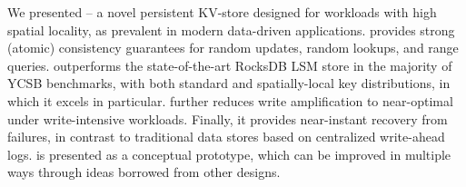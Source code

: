 We presented \sys\/ -- a novel persistent KV-store designed for workloads with high spatial locality, as prevalent in modern data-driven 
applications. \sys\/ provides strong (atomic) consistency guarantees for random updates, random lookups, and range queries. 
\sys\/ outperforms the state-of-the-art RocksDB LSM store  in the  majority of YCSB benchmarks, with both 
standard and spatially-local key distributions, in which it excels in particular. \sys\/ further reduces write amplification to near-optimal under write-intensive 
workloads. Finally, it provides near-instant recovery from failures, in contrast to traditional data stores based on centralized write-ahead logs.
\sys\/ is presented as a conceptual prototype, which can be improved in multiple ways through ideas borrowed from other designs. 
